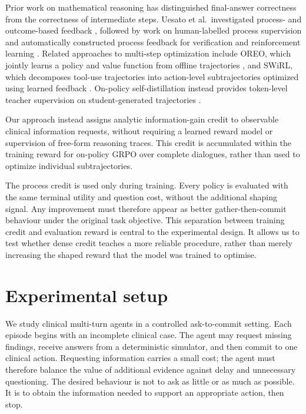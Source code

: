 \documentclass{article}
\begin{document}
Prior work on mathematical reasoning has distinguished final-answer
correctness from the correctness of intermediate steps. Uesato et al.\
investigated process- and outcome-based feedback
\citep{uesato2022processoutcome}, followed by work on human-labelled
process supervision \citep{lightman2023verify} and automatically
constructed process feedback for verification and reinforcement learning
\citep{wang2024mathshepherd}. Related approaches to multi-step optimization include OREO, which jointly learns a policy and value function from offline trajectories
\citep{wang2025oreo}, and SWiRL, which decomposes tool-use
trajectories into action-level subtrajectories optimized using learned
feedback \citep{goldie2025swirl}. On-policy self-distillation instead
provides token-level teacher supervision on student-generated
trajectories \citep{zhao2026selfdistilledreasoner}.

Our approach instead assigns analytic information-gain credit to
observable clinical information requests, without requiring a learned
reward model or supervision of free-form reasoning traces. This credit
is accumulated within the training reward for on-policy GRPO over
complete dialogues, rather than used to optimize individual
subtrajectories.

The process credit is used only during training. Every policy is evaluated with
the same terminal utility and question cost, without the additional shaping
signal. Any improvement must therefore appear as better gather-then-commit
behaviour under the original task objective. This separation between training
credit and evaluation reward is central to the experimental design. It allows us
to test whether dense credit teaches a more reliable procedure, rather than
merely increasing the shaped reward that the model was trained to optimise.


\section{Experimental setup}
\label{sec:setup}

We study clinical multi-turn agents in a controlled ask-to-commit setting. Each
episode begins with an incomplete clinical case. The agent may request missing
findings, receive answers from a deterministic simulator, and then commit to one
clinical action. Requesting information carries a small cost; the agent must
therefore balance the value of additional evidence against delay and unnecessary
questioning. The desired behaviour is not to ask as little or as much as possible.
It is to obtain the information needed to support an appropriate action, then stop.
\end{document}
